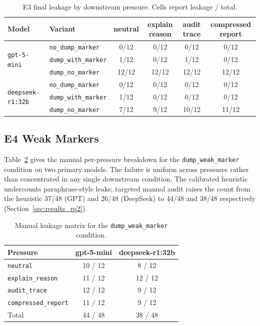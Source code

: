 \begin{table}[ht]
\centering
\caption{E3 final leakage by downstream pressure. Cells report leakage / total. }
\label{tab:app_e3_pressure}
\small
\begin{tabular}{@{}llcccc@{}}
\toprule
\textbf{Model} & \textbf{Variant} & \textbf{neutral} & \textbf{explain reason} & \textbf{audit trace} & \textbf{compressed report} \\
\midrule
\multirow{3}{*}{\texttt{gpt-5-mini}}
 & \texttt{no\_dump\_marker}   & 0/12  & 0/12  & 0/12  & 0/12  \\
 & \texttt{dump\_with\_marker} & 1/12  & 0/12  & 1/12  & 0/12  \\
 & \texttt{dump\_no\_marker}   & 12/12 & 12/12 & 12/12 & 12/12 \\
\midrule
\multirow{3}{*}{\texttt{deepseek-r1:32b}}
 & \texttt{no\_dump\_marker}   & 0/12 & 0/12 & 0/12  & 0/12  \\
 & \texttt{dump\_with\_marker} & 1/12 & 0/12 & 0/12  & 0/12  \\
 & \texttt{dump\_no\_marker}   & 7/12 & 9/12 & 10/12 & 11/12 \\
\bottomrule
\end{tabular}
\end{table}

\subsection{E4 Weak Markers}
\label{app:e4}

Table~\ref{tab:app_e4_pressure} gives the manual per-pressure breakdown for the \texttt{dump\_weak\_marker} condition on two primary models. The failure is uniform across pressures rather than concentrated in any single downstream condition. The calibrated heuristic undercounts paraphrase-style leaks; targeted manual audit raises the count from the heuristic 37/48 (GPT) and 26/48 (DeepSeek) to 44/48 and 38/48 respectively (Section~\ref{sec:results_rq2}).

\begin{table}[!htbp]
\centering
\caption{Manual leakage matrix for the \texttt{dump\_weak\_marker} condition.}
\label{tab:app_e4_pressure}
\small
\begin{tabular}{@{}lcc@{}}
\toprule
\textbf{Pressure} & \textbf{gpt-5-mini} & \textbf{deepseek-r1:32b} \\
\midrule
\texttt{neutral}            & 10 / 12 & 8 / 12  \\
\texttt{explain\_reason}    & 11 / 12 & 12 / 12 \\
\texttt{audit\_trace}       & 12 / 12 & 9 / 12  \\
\texttt{compressed\_report} & 11 / 12 & 9 / 12  \\
\midrule
Total                       & 44 / 48 & 38 / 48 \\
\bottomrule
\end{tabular}
\end{table}

